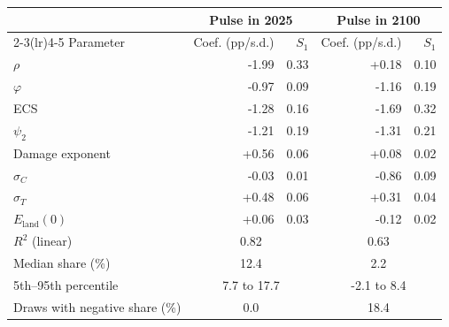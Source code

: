 \begin{tabular}{lrrrr}
\toprule
 & \multicolumn{2}{c}{Pulse in 2025} & \multicolumn{2}{c}{Pulse in 2100} \\
\cmidrule(lr){2-3}\cmidrule(lr){4-5}
Parameter & Coef. (pp/s.d.) & $S_1$ & Coef. (pp/s.d.) & $S_1$ \\
\midrule
$\rho$ & -1.99 & 0.33 & +0.18 & 0.10 \\
$\varphi$ & -0.97 & 0.09 & -1.16 & 0.19 \\
ECS & -1.28 & 0.16 & -1.69 & 0.32 \\
$\psi_2$ & -1.21 & 0.19 & -1.31 & 0.21 \\
Damage exponent & +0.56 & 0.06 & +0.08 & 0.02 \\
$\sigma_C$ & -0.03 & 0.01 & -0.86 & 0.09 \\
$\sigma_T$ & +0.48 & 0.06 & +0.31 & 0.04 \\
$E_{\mathrm{land}}(0)$ & +0.06 & 0.03 & -0.12 & 0.02 \\
\midrule
$R^2$ (linear) & \multicolumn{2}{c}{0.82} & \multicolumn{2}{c}{0.63} \\
Median share (\%) & \multicolumn{2}{c}{12.4} & \multicolumn{2}{c}{2.2} \\
5th--95th percentile & \multicolumn{2}{c}{7.7 to 17.7} & \multicolumn{2}{c}{-2.1 to 8.4} \\
Draws with negative share (\%) & \multicolumn{2}{c}{0.0} & \multicolumn{2}{c}{18.4} \\
\bottomrule
\end{tabular}
